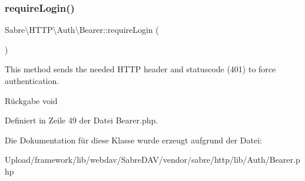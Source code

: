 \subsubsection{\texorpdfstring{require\+Login()}{requireLogin()}}
{\footnotesize\ttfamily Sabre\textbackslash{}\+H\+T\+T\+P\textbackslash{}\+Auth\textbackslash{}\+Bearer\+::require\+Login (\begin{DoxyParamCaption}{ }\end{DoxyParamCaption})}

This method sends the needed H\+T\+TP header and statuscode (401) to force authentication.

\begin{DoxyReturn}{Rückgabe}
void 
\end{DoxyReturn}


Definiert in Zeile 49 der Datei Bearer.\+php.



Die Dokumentation für diese Klasse wurde erzeugt aufgrund der Datei\+:\begin{DoxyCompactItemize}
\item 
Upload/framework/lib/webdav/\+Sabre\+D\+A\+V/vendor/sabre/http/lib/\+Auth/Bearer.\+php\end{DoxyCompactItemize}
